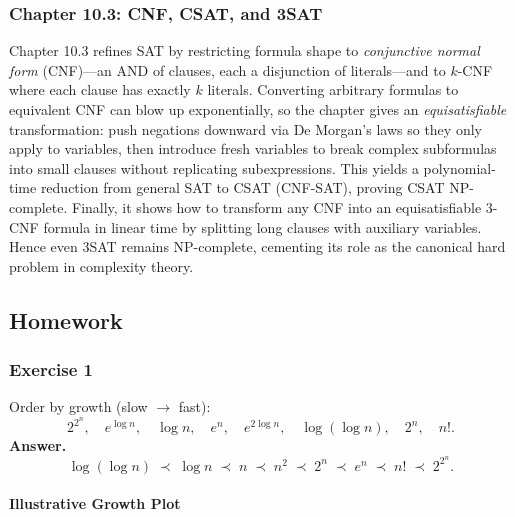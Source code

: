 \documentclass{article}
\theoremstyle{theorem}
\theoremstyle{definition}
\theoremstyle{remark}
\begin{document}
\subsubsection*{Chapter 10.3: CNF, CSAT, and 3SAT}
Chapter 10.3 refines SAT by restricting formula shape to \emph{conjunctive normal form} (CNF)—an AND of clauses, each a disjunction of literals—and to \(k\)-CNF where each clause has exactly \(k\) literals. Converting arbitrary formulas to equivalent CNF can blow up exponentially, so the chapter gives an \emph{equisatisfiable} transformation: push negations downward via De Morgan’s laws so they only apply to variables, then introduce fresh variables to break complex subformulas into small clauses without replicating subexpressions. This yields a polynomial-time reduction from general SAT to CSAT (CNF-SAT), proving CSAT NP-complete. Finally, it shows how to transform any CNF into an equisatisfiable 3-CNF formula in linear time by splitting long clauses with auxiliary variables. Hence even 3SAT remains NP-complete, cementing its role as the canonical hard problem in complexity theory.

\subsection{Homework}
\subsubsection*{Exercise 1}
Order by growth (slow \(\to\) fast):
\[
2^{2^n},\quad e^{\log n},\quad \log n,\quad e^n,\quad
e^{2\log n},\quad \log(\log n),\quad 2^n,\quad n!.
\]
\textbf{Answer.}
\[
\log(\log n)\;\prec\;\log n\;\prec\;n\;\prec\;n^2\;\prec\;2^n\;\prec\;e^n\;\prec\;n!\;\prec\;2^{2^n}.
\]

\paragraph{Illustrative Growth Plot}
\begin{center}
\end{center}
\end{document}
